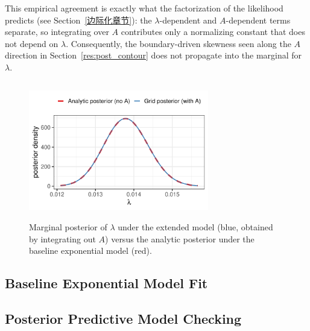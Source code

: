 This empirical agreement is exactly what the factorization of the likelihood predicts (see Section~\ref{边际化章节}): the $\lambda$-dependent and $A$-dependent terms separate, so integrating over $A$ contributes only a normalizing constant that does not depend on $\lambda$. Consequently, the boundary-driven skewness seen along the $A$ direction in Section~\ref{res:post_contour} does not propagate into the marginal for $\lambda$.

\begin{figure}[H]
    \centering
    \includegraphics[height=6cm, width=0.7\textwidth]{images/lambda_marginal_compare.pdf}
    \caption{{\small Marginal posterior of $\lambda$ under the extended model (blue, obtained by integrating out $A$) versus the analytic posterior under the baseline exponential model (red).}}
    \label{fig:marginal}
\end{figure}




\subsection{Baseline Exponential Model Fit}
\label{ecdf的分析}




\subsection{Posterior Predictive Model Checking}